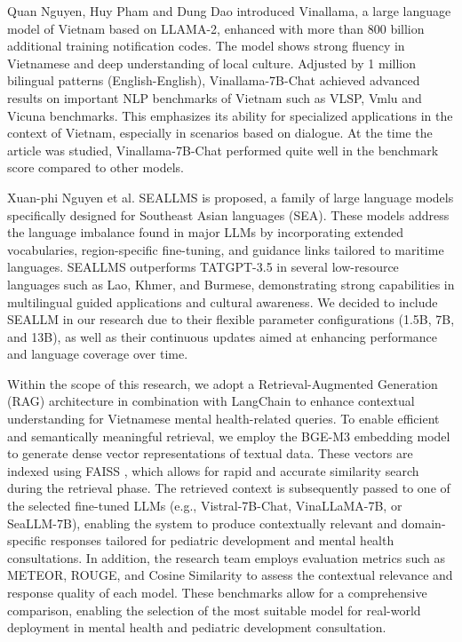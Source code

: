 \documentclass[conference]{IEEEtran}
\begin{document}
Quan Nguyen, Huy Pham and Dung Dao \cite{b3} introduced Vinallama, a large language model of Vietnam based on LLAMA-2, enhanced with more than 800 billion additional training notification codes. The model shows strong fluency in Vietnamese and deep understanding of local culture. Adjusted by 1 million bilingual patterns (English-English), Vinallama-7B-Chat achieved advanced results on important NLP benchmarks of Vietnam such as VLSP, Vmlu and Vicuna benchmarks. This emphasizes its ability for specialized applications in the context of Vietnam, especially in scenarios based on dialogue. At the time the article was studied, Vinallama-7B-Chat performed quite well in the benchmark score compared to other models.

Xuan-phi Nguyen et al. \cite{b4} SEALLMS is proposed, a family of large language models specifically designed for Southeast Asian languages (SEA). These models address the language imbalance found in major LLMs by incorporating extended vocabularies, region-specific fine-tuning, and guidance links tailored to maritime languages. SEALLMS outperforms TATGPT-3.5 in several low-resource languages such as Lao, Khmer, and Burmese, demonstrating strong capabilities in multilingual guided applications and cultural awareness. We decided to include SEALLM in our research due to their flexible parameter configurations (1.5B, 7B, and 13B), as well as their continuous updates aimed at enhancing performance and language coverage over time.

Within the scope of this research, we adopt a Retrieval-Augmented Generation (RAG) architecture in combination with LangChain \cite{b5} to enhance contextual understanding for Vietnamese mental health-related queries. To enable efficient and semantically meaningful retrieval, we employ the BGE-M3 embedding model \cite{b6} to generate dense vector representations of textual data. These vectors are indexed using FAISS \cite{b7}, which allows for rapid and accurate similarity search during the retrieval phase. The retrieved context is subsequently passed to one of the selected fine-tuned LLMs (e.g., Vistral-7B-Chat, VinaLLaMA-7B, or SeaLLM-7B), enabling the system to produce contextually relevant and domain-specific responses tailored for pediatric development and mental health consultations. In addition, the research team employs evaluation metrics such as METEOR, ROUGE, and Cosine Similarity \cite{b8} \cite{b9} to assess the contextual relevance and response quality of each model. These benchmarks allow for a comprehensive comparison, enabling the selection of the most suitable model for real-world deployment in mental health and pediatric development consultation.
\end{document}
